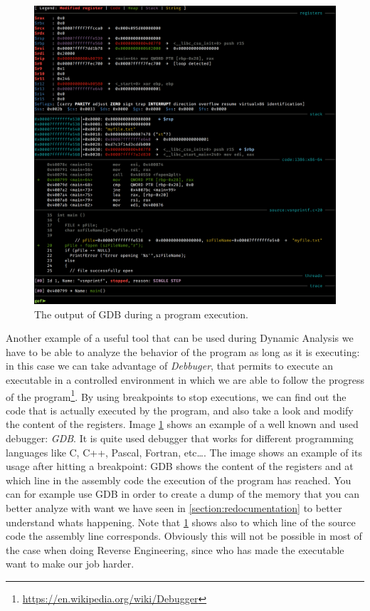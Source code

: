 \documentclass{article}
\begin{document}
\begin{figure}[htp]
    \centering
    \includegraphics[width=1\textwidth]{images/gdb.png}
    \caption{The output of GDB during a program execution.}
    \label{fig:gdb}
\end{figure}
Another example of a useful tool that can be used during Dynamic Analysis we have to be able to analyze the behavior of the program as long as it is executing: in this case we can take advantage of \textit{Debbuger}, that permits to execute an executable in a controlled environment in which we are able to follow the progress of the program\footnote{\url{https://en.wikipedia.org/wiki/Debugger}}. By using breakpoints to stop executions, we can find out the code that is actually executed by the program, and also take a look and modify the content of the registers.
Image \ref{fig:gdb} shows an example of a well known and used debugger: \textit{GDB}. It is quite used debugger that works for different programming languages like C, C++, Pascal, Fortran, etc\dots.
The image shows an example of its usage after hitting a breakpoint: GDB shows the content of the registers and at which line in the assembly code the execution of the program has reached. You can for example use GDB in order to create a dump of the memory that you can better analyze with want we have seen in \ref{section:redocumentation} to better understand whats happening.
Note that \ref{fig:gdb} shows also to which line of the source code the assembly line corresponds. Obviously this will not be possible in most of the case when doing Reverse Engineering, since who has made the executable want to make our job harder.
\end{document}
